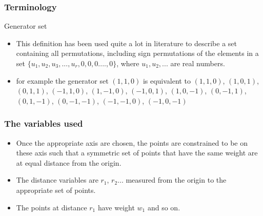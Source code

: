 \documentclass{beamer}
\begin{document}
\begin{frame}
\frametitle{Terminology}
\begin{block}{Generator set}
\begin{itemize}[<+->]
\item This definition has been used quite a lot in literature to describe a set containing all permutations, including sign permutations of the elements in a set $\{u_1,u_2,u_3,...,u_r,0,0,0....,0\}$, where $u_1,u_2,...$ are real numbers.
\item for example the generator set $(1,1,0)$ is equivalent to $(1,1,0)$, $(1,0,1)$, $(0,1,1)$, $(-1,1,0)$, $(1,-1,0)$, $(-1,0,1)$, $(1,0,-1)$, $(0,-1,1)$, $(0,1,-1)$, $(0,-1,-1)$, $(-1,-1,0)$, $(-1,0,-1)$
\end{itemize} 
\end{block}
\end{frame}
\begin{frame}
\frametitle{The variables used}
\begin{itemize}[<+->]
\item Once the appropriate axis are chosen, the points are constrained to be on these axis such that a symmetric set of points that have the same weight are at equal distance from the origin.
\item The distance variables are $r_1$, $r_2$... measured from the origin to the appropriate set of points. 
\item The points at distance $r_1$ have weight $w_1$ and so on. 
\end{itemize}
\end{frame}
\end{document}
